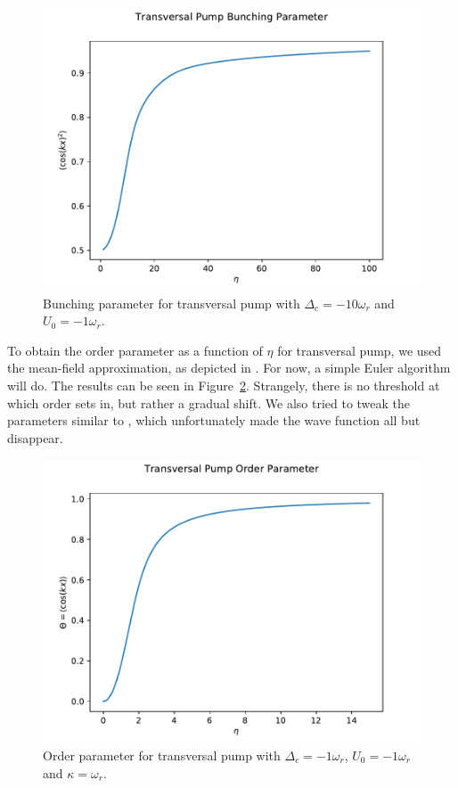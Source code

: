 \begin{figure}[ht]
  \centering
  \includegraphics[width=.7\linewidth]{trans_pmp_bunch.pdf}
  \caption{Bunching parameter for transversal pump with $\Delta_c = -10 \omega_r$ and $U_0 = -1 \omega_r$.}
  \label{trans_pmp_bunch}
\end{figure}
\FloatBarrier

\noindent To obtain the order parameter as a function of $\eta$ for transversal pump, we used the mean-field approximation, as depicted in \cite{cold_atoms}. For now, a simple Euler algorithm will do. The results can be seen in Figure~\ref{trans_pmp_order}. Strangely, there is no threshold at which order sets in, but rather a gradual shift. We also tried to tweak the parameters similar to \cite{Nagy2008}, which unfortunately made the wave function all but disappear.

\begin{figure}[ht]
  \centering
  \includegraphics[width=.7\linewidth]{trans_pmp_order.pdf}
  \caption{Order parameter for transversal pump with $\Delta_c = -1 \omega_r$, $U_0 = -1 \omega_r$ and $\kappa = \omega_r$.}
  \label{trans_pmp_order}
\end{figure}
\FloatBarrier